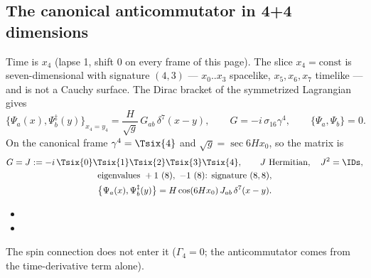 \subsection{The canonical anticommutator in 4+4 dimensions}
\label{sec:3.4}

Time is $x_4$ (lapse 1, shift 0 on every frame of this page). The slice $x_4=\text{const}$ is
seven-dimensional with signature $(4,3)$ --- $x_0..x_3$ spacelike, $x_5,x_6,x_7$ timelike --- and is
not a Cauchy surface. The Dirac bracket of the symmetrized Lagrangian gives
\[
  \bigl\{\Psi_a(x),\Psi^{\ddagger}_b(y)\bigr\}_{x_4=y_4}=\frac{H}{\sqrt g}\,G_{ab}\,\delta^7(x-y),\qquad
  G=-i\,\sigma_{16}\gamma^4,\qquad \{\Psi_a,\Psi_b\}=0 .
\]
On the canonical frame $\gamma^4=\Tsix{4}$ and $\sqrt g=\sec 6Hx_0$, so the matrix is
\begin{gather*}
  G=J:=-i\,\Tsix{0}\Tsix{1}\Tsix{2}\Tsix{3}\Tsix{4},\qquad J\ \text{Hermitian},\quad J^2=\IDs,\\
  \text{eigenvalues }+1\ (8),\ -1\ (8)\text{: signature }(8,8),\\
  \bigl\{\Psi_a(x),\Psi^{\ddagger}_b(y)\bigr\}=H\cos(6Hx_0)\,J_{ab}\,\delta^7(x-y).
\end{gather*}
\begin{itemize}
  \item {}
  \item {}
\end{itemize}
The spin connection does not enter it ($\Gamma_4=0$; the anticommutator comes from the time-derivative
term alone).

